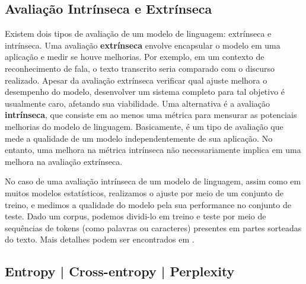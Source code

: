 \documentclass{automatextcc}
\begin{document}

\subsection{Avaliação Intrínseca e Extrínseca}
Existem dois tipos de avaliação de um modelo de linguagem: extrínseca e intrínseca. Uma avaliação \textbf{extrínseca} envolve encapsular o modelo em uma aplicação e medir se houve melhorias. Por exemplo, em um contexto de reconhecimento de fala, o texto transcrito seria comparado com o discurso realizado. Apesar da avaliação extrínseca verificar qual ajuste melhora o desempenho do modelo, desenvolver um sistema completo para tal objetivo é usualmente caro, afetando sua viabilidade. Uma alternativa é a avaliação \textbf{intrínseca}, que consiste em ao menos uma métrica para mensurar as potenciais melhorias do modelo de linguagem. Basicamente, é um tipo de avaliação que mede a qualidade de um modelo independentemente de sua aplicação. No entanto, uma melhora na métrica intrínseca não necessariamente implica em uma melhora na avaliação extrínseca. 

No caso de uma avaliação intrínseca de um modelo de linguagem, assim como em muitos modelos estatísticos, realizamos o ajuste por meio de um conjunto de treino, e medimos a qualidade do modelo pela sua performance no conjunto de teste. Dado um corpus, podemos dividi-lo em treino e teste por meio de sequências de tokens (como palavras ou caracteres) presentes em partes sorteadas do texto. Mais detalhes podem ser encontrados em \citet{goldberg2017, jurafsky2021}.


\subsection{Entropy | Cross-entropy | Perplexity}
\end{document}
